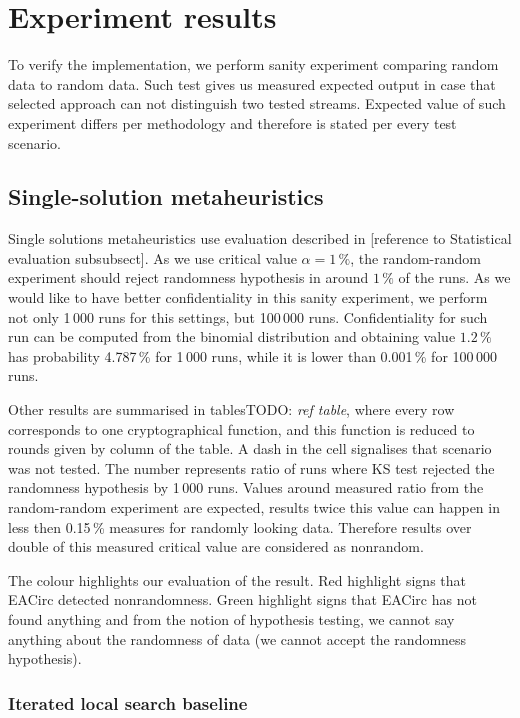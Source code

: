 \documentclass[
  print, %
  Table,   %
  nolof,     %
  nolot,     %
  11pt, %
  oneside  %
]{fithesis3}
\newcommand{\todo}[1]{TODO: \textit{#1}}
\begin{document}
\chapter{Experiment results}

To verify the implementation, we perform sanity experiment comparing random data to random data. Such test gives us measured expected output in case that selected approach can not distinguish two tested streams. Expected value of such experiment differs per methodology and therefore is stated per every test scenario.

\section{Single-solution metaheuristics}


Single solutions metaheuristics use evaluation described in [reference to Statistical evaluation subsubsect]. As we use critical value $\alpha=1\,\%$, the random-random experiment should reject randomness hypothesis in around $1\,\%$ of the runs. As we would like to have better confidentiality in this sanity experiment, we perform not only 1\,000 runs for this settings, but 100\,000 runs. Confidentiality for such run can be computed from the binomial distribution and obtaining value $1.2\,\%$ has probability 4.787\,\% for 1\,000 runs, while it is lower than 0.001\,\% for 100\,000 runs.

Other results are summarised in tables\todo{ref table}, where every row corresponds to one cryptographical function, and this function is reduced to rounds given by column of the table. A dash in the cell signalises that scenario was not tested. The number represents ratio of runs where KS test rejected the randomness hypothesis by 1\,000 runs. Values around measured ratio from the random-random experiment are expected, results twice this value can happen in less then 0.15\,\% measures for randomly looking data. Therefore results over double of this measured critical value are considered as nonrandom.

The colour highlights our evaluation of the result. Red highlight signs that EACirc detected nonrandomness. Green highlight signs that EACirc has not found anything and from the notion of hypothesis testing, we cannot say anything about the randomness of data (we cannot accept the randomness hypothesis).

\subsection{Iterated local search baseline}
\end{document}
